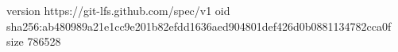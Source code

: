 version https://git-lfs.github.com/spec/v1
oid sha256:ab480989a21e1cc9e201b82efdd1636aed904801def426d0b0881134782cca0f
size 786528

